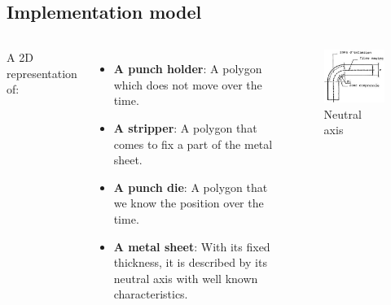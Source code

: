 \documentclass{beamer}
\begin{document}
\subsection{Implementation model}
\begin{frame}
    \begin{columns}
        A 2D representation of:
        \begin{itemize}
            \item \textbf{A punch holder}: 
                A polygon which does not move over the time.
            \item \textbf{A stripper}:
                A polygon that comes to fix a part of the metal sheet.
            \item \textbf{A punch die}:
                A polygon that we know the position over the time.
            \item \textbf{A metal sheet}:
                With its fixed thickness, it is described by its neutral axis with well known characteristics.
        \end{itemize}
        \begin{figure}
            \includegraphics[width=\textwidth]{img/fibreNeutre.jpg}
            \caption{Neutral axis}
            \label{FibreNeudre}
        \end{figure}
    \end{columns}
\end{frame}
\end{document}
